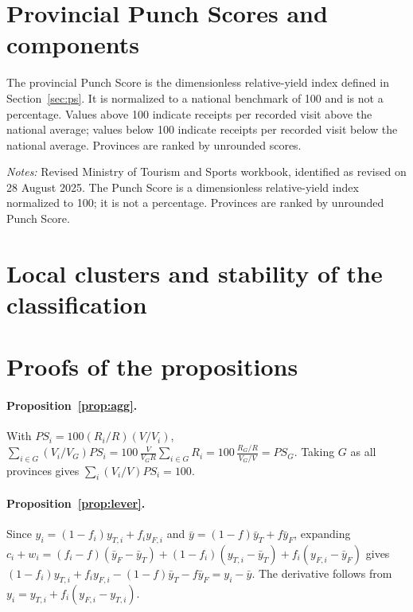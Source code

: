\documentclass[11pt,a4paper]{article}
\newcommand{\PS}{\mathit{PS}}
\theoremstyle{plain}\newtheorem{proposition}{Proposition}
\theoremstyle{definition}\newtheorem{definition}{Definition}
\begin{document}
\appendix
\section{Provincial Punch Scores and components}
The provincial Punch Score is the dimensionless relative-yield index defined in Section~\ref{sec:ps}. It is normalized to a national benchmark of 100 and is not a percentage. Values above 100 indicate receipts per recorded visit above the national average; values below 100 indicate receipts per recorded visit below the national average. Provinces are ranked by unrounded scores.
\begin{center}\scriptsize
{}\label{tab:all}

\end{center}
{\scriptsize\emph{Notes:} Revised Ministry of Tourism and Sports workbook, identified as revised on 28 August 2025. The Punch Score is a dimensionless relative-yield index normalized to 100; it is not a percentage. Provinces are ranked by unrounded Punch Score.}

\section{Local clusters and stability of the classification}
\begin{table}[h]\centering\small
\caption{Significant local Moran statistics for the logarithm of receipts per visit (five nearest neighbours, 9,999 conditional permutations, two-sided pseudo-$p<0.05$, unadjusted) and provinces significant in at least 25\% of 20 independent permutation runs}\label{tab:lisa}

\end{table}

\section{Proofs of the propositions}\label{app:proofs}
\paragraph{Proposition~\ref{prop:agg}.} With $\PS_i=100(R_i/R)(V/V_i)$, $\sum_{i\in G}(V_i/V_G)\PS_i=100\,\frac{V}{V_GR}\sum_{i\in G}R_i=100\,\frac{R_G/R}{V_G/V}=\PS_G$. Taking $G$ as all provinces gives $\sum_i(V_i/V)\PS_i=100$.

\paragraph{Proposition~\ref{prop:lever}.} Since $y_i=(1-f_i)y_{T,i}+f_iy_{F,i}$ and $\bar y=(1-f)\bar y_T+f\bar y_F$, expanding $c_i+w_i=(f_i-f)(\bar y_F-\bar y_T)+(1-f_i)(y_{T,i}-\bar y_T)+f_i(y_{F,i}-\bar y_F)$ gives $(1-f_i)y_{T,i}+f_iy_{F,i}-(1-f)\bar y_T-f\bar y_F=y_i-\bar y$. The derivative follows from $y_i=y_{T,i}+f_i(y_{F,i}-y_{T,i})$.
\end{document}
